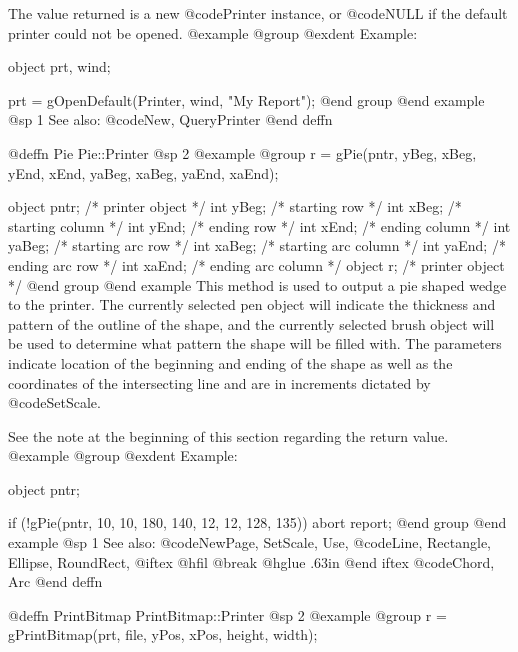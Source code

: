 The value returned is a new @code{Printer} instance, or @code{NULL}
if the default printer could not be opened.
@example
@group
@exdent Example:

object  prt, wind;

prt = gOpenDefault(Printer, wind, "My Report");
@end group
@end example
@sp 1
See also:  @code{New, QueryPrinter}
@end deffn



















@deffn {Pie} Pie::Printer
@sp 2
@example
@group
r = gPie(pntr, yBeg, xBeg, yEnd, xEnd, yaBeg, xaBeg, yaEnd, xaEnd);

object  pntr;   /*  printer object         */
int     yBeg;   /*  starting row           */
int     xBeg;   /*  starting column        */
int     yEnd;   /*  ending row             */
int     xEnd;   /*  ending column          */
int     yaBeg;  /*  starting arc row       */
int     xaBeg;  /*  starting arc column    */
int     yaEnd;  /*  ending arc row         */
int     xaEnd;  /*  ending arc column      */
object  r;      /*  printer object         */
@end group
@end example
This method is used to output a pie shaped wedge to the printer.  The
currently selected pen object will indicate the thickness and pattern of
the outline of the shape, and the currently selected brush object will
be used to determine what pattern the shape will be filled with.  The
parameters indicate location of the beginning and ending of the shape as
well as the coordinates of the intersecting line and are in increments
dictated by @code{SetScale}.

See the note at the beginning of this section regarding the return value.
@example
@group
@exdent Example:

object  pntr;

if (!gPie(pntr, 10, 10, 180, 140, 12, 12, 128, 135))
        abort report;
@end group
@end example
@sp 1
See also:  @code{NewPage, SetScale, Use,}
        @code{Line, Rectangle, Ellipse, RoundRect,}
@iftex
@hfil @break @hglue .63in 
@end iftex
@code{Chord, Arc}
@end deffn




@deffn {PrintBitmap} PrintBitmap::Printer
@sp 2
@example
@group
r = gPrintBitmap(prt, file, yPos, xPos, height, width);


